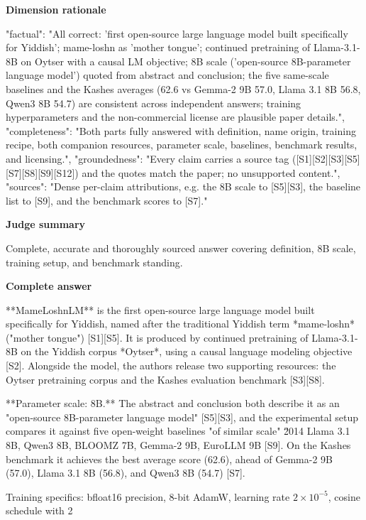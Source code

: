 \documentclass[10pt]{article}
\begin{document}
\textbf{Dimension rationale}
\begin{EvidenceText}
{
  "factual": "All correct: 'first open-source large language model built specifically for Yiddish'; mame-loshn as 'mother tongue'; continued pretraining of Llama-3.1-8B on Oytser with a causal LM objective; 8B scale ('open-source 8B-parameter language model') quoted from abstract and conclusion; the five same-scale baselines and the Kashes averages (62.6 vs Gemma-2 9B 57.0, Llama 3.1 8B 56.8, Qwen3 8B 54.7) are consistent across independent answers; training hyperparameters and the non-commercial license are plausible paper details.",
  "completeness": "Both parts fully answered with definition, name origin, training recipe, both companion resources, parameter scale, baselines, benchmark results, and licensing.",
  "groundedness": "Every claim carries a source tag ([S1][S2][S3][S5][S7][S8][S9][S12]) and the quotes match the paper; no unsupported content.",
  "sources": "Dense per-claim attributions, e.g. the 8B scale to [S5][S3], the baseline list to [S9], and the benchmark scores to [S7]."
}
\end{EvidenceText}

\textbf{Judge summary}
\begin{EvidenceText}
Complete, accurate and thoroughly sourced answer covering definition, 8B scale, training setup, and benchmark standing.
\end{EvidenceText}

\textbf{Complete answer}
\begin{AnswerText}
**MameLoshnLM** is the first open-source large language model built specifically for Yiddish, named after the traditional Yiddish term *mame-loshn* ("mother tongue") [S1][S5]. It is produced by continued pretraining of Llama-3.1-8B on the Yiddish corpus *Oytser*, using a causal language modeling objective [S2]. Alongside the model, the authors release two supporting resources: the Oytser pretraining corpus and the Kashes evaluation benchmark [S3][S8].

**Parameter scale: 8B.** The abstract and conclusion both describe it as an "open-source 8B-parameter language model" [S5][S3], and the experimental setup compares it against five open-weight baselines "of similar scale" \u2014 Llama 3.1 8B, Qwen3 8B, BLOOMZ 7B, Gemma-2 9B, EuroLLM 9B [S9]. On the Kashes benchmark it achieves the best average score (62.6), ahead of Gemma-2 9B (57.0), Llama 3.1 8B (56.8), and Qwen3 8B (54.7) [S7].

Training specifics: bfloat16 precision, 8-bit AdamW, learning rate $2\times10^{-5}$, cosine schedule with 2%
\end{AnswerText}
\end{document}
